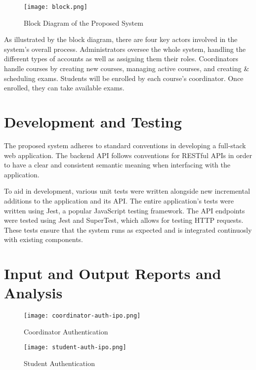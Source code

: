 \begin{figure}[h!]
    \begin{center}
        \texttt{[image: block.png]}
        \caption{Block Diagram of the Proposed System}
    \end{center}
\end{figure}

As illustrated by the block diagram, there are four key actors involved in the system's overall process.
Administrators oversee the whole system, handling the different types of accounts as well as assigning them their roles.
Coordinators handle courses by creating new courses, managing active courses, and creating \& scheduling exams.
Students will be enrolled by each course's coordinator.
Once enrolled, they can take available exams.

\section{Development and Testing}

The proposed system adheres to standard conventions in developing a full-stack web application.
The backend API follows conventions for RESTful APIs in order to have a clear and consistent semantic meaning when interfacing with the application.

To aid in development, various unit tests were written alongside new incremental additions to the application and its API.
The entire application's tests were written using Jest, a popular JavaScript testing framework.
The API endpoints were tested using Jest and SuperTest, which allows for testing HTTP requests.
These tests ensure that the system runs as expected and is integrated continuosly with existing components.

\section{Input and Output Reports and Analysis}

\begin{figure}[h!]
    \begin{center}
        \texttt{[image: coordinator-auth-ipo.png]}
        \caption{Coordinator Authentication}
    \end{center}
\end{figure}

\begin{figure}[h!]
    \begin{center}
        \texttt{[image: student-auth-ipo.png]}
        \caption{Student Authentication}
    \end{center}
\end{figure}

